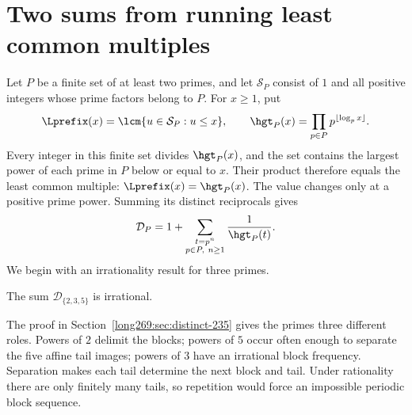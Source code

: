 \maketitle
\noteprovenance

\begin{abstract}
We study the running least common multiples of integers whose prime
factors belong to a fixed finite set.
For $\{2,3,5\}$, a five-map argument proves irrationality of the sum over
distinct running LCMs. Two-prime sums reduce to a transcendental Hecke--Mahler
value. For the repeated three-prime sum we give an equivalent residue
criterion, whose arithmetic condition remains open. Complete ordinary
arguments for general sums over distinct running LCMs and prime-power subseries are
retained as remarks awaiting formalisation.
\end{abstract}

\section{Two sums from running least common multiples}\label{long269:sec:problem}
Let $P$ be a finite set of at least two primes, and let $\mathcal S_P$
consist of $1$ and all positive integers whose prime factors belong to
$P$. For $x\ge1$, put
\[
 \Lprefix(x)=\lcm\{u\in\mathcal S_P:u\le x\},\qquad
 \hgt_P(x)=\prod_{p\in P}p^{\lfloor\log_p x\rfloor}.
\]
Every integer in this finite set divides $\hgt_P(x)$, and the set
contains the largest power of each prime in $P$ below or equal to $x$.
Their product therefore equals the least common multiple:
$\Lprefix(x)=\hgt_P(x)$. The value changes only at a positive prime
power. Summing its distinct reciprocals gives
\[
 \mathcal D_P=1+\sum_{\substack{t=p^n\\p\in P,\ n\ge1}}\frac1{\hgt_P(t)}.
\]
We begin with an irrationality result for three primes.

\begin{theorem}\label{long269:res:distinct-height-235}
The sum $\mathcal D_{\{2,3,5\}}$ is irrational.
\end{theorem}

The proof in Section~\ref{long269:sec:distinct-235} gives the primes three
different roles. Powers of $2$ delimit the blocks; powers of $5$ occur
often enough to separate the five affine tail images; powers of $3$
have an irrational block frequency. Separation makes each tail determine
the next block and tail. Under rationality there are only finitely many
tails, so repetition would force an impossible periodic block sequence.

